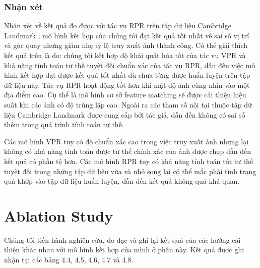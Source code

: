 \subsubsection*{Nhận xét}
Nhận xét về kết quả đo được với tác vụ RPR trên tập dữ liệu Cambridge Landmark \cite{kendall2016posenet}, mô hình kết hợp của chúng tôi đạt kết quả tốt nhất về sai số vị trí và góc quay nhưng giảm nhẹ tỷ lệ truy xuất ảnh thành công. Có thể giải thích kết quả trên là do: chúng tôi kết hợp độ khái quát hóa tốt của tác vụ VPR và khả năng tính toán tư thế tuyệt đối chuẩn xác của tác vụ RPR, dẫn đến việc mô hình kết hợp đạt được kết quả tốt nhất dù chưa từng được huấn luyện trên tập dữ liệu này. Tác vụ RPR hoạt động tốt hơn khi mật độ ảnh cùng nhìn vào một địa điểm cao. Cụ thể là mô hình cơ sở feature matching sẽ được cải thiện hiệu suất khi các ảnh có độ trùng lặp cao. Ngoài ra các tham số nội tại thuộc tập dữ liệu Cambridge Landmark được cung cấp bởi tác giả, dẫn đến không có sai số thêm trong quá trình tính toán tư thế.

Các mô hình VPR tuy có độ chuẩn xác cao trong việc truy xuất ảnh nhưng lại không có khả năng tính toán được tư thế chính xác của ảnh được chụp dẫn đến kết quả có phần tệ hơn. Các mô hình RPR tuy có khả năng tính toán tốt tư thế tuyệt đối trong những tập dữ liệu vừa và nhỏ song lại có thể mắc phải tình trạng quá khớp vào tập dữ liệu huấn luyện, dẫn đến kết quả không quá khả quan.

\section{Ablation Study}
Chúng tôi tiến hành nghiên cứu, đo đạc và ghi lại kết quả của các hướng cải thiện khác nhau với mô hình kết hợp của mình ở phần này. Kết quả được ghi nhận tại các bảng 4.4, 4.5, 4.6, 4.7 và 4.8.

